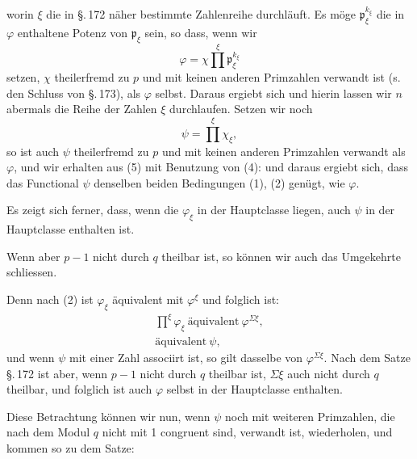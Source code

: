 worin $\xi$ die in \S.\,172 näher bestimmte Zahlenreihe durchläuft.
Es möge $\mathfrak{p}_\xi^{k_\xi}$ die in $\varphi$ enthaltene Potenz von
$\mathfrak{p}_\xi$ sein, so dass, wenn wir
\[
\varphi = \chi \prod^{\xi} \mathfrak{p}_\xi^{k_\xi}
\]
setzen, $\chi$ theilerfremd zu $p$ und mit keinen anderen Primzahlen verwandt
ist (s. den Schluss von \S.\,173), als $\varphi$ selbst. Daraus ergiebt sich
und hierin lassen wir $n$ abermals die Reihe der Zahlen $\xi$ durchlaufen.
Setzen wir noch
\[
\psi = \prod^{\xi} \chi_\xi,
\]
so ist auch $\psi$ theilerfremd zu $p$ und mit keinen anderen Primzahlen
 verwandt als $\varphi$, und wir erhalten aus (5) mit Benutzung von (4):
und daraus ergiebt sich, dass das Functional $\psi$ denselben beiden
Bedingungen (1), (2) genügt, wie $\varphi$.

Es zeigt sich ferner, dass, wenn die $\varphi_\xi$ in der Hauptclasse
liegen, auch $\psi$ in der Hauptclasse enthalten ist.

Wenn aber $p-1$ nicht durch $q$ theilbar ist, so können wir
auch das Umgekehrte schliessen.

Denn nach (2) ist $\varphi_\xi$ äquivalent mit $\varphi^\xi$ und folglich ist:
\[
\begin{gathered}
\prod^{\xi} \varphi_\xi \ \text{äquivalent}\ \varphi^{\Sigma\xi}, \\
\text{äquivalent}\ \psi,
\end{gathered}
\]
und wenn $\psi$ mit einer Zahl associirt ist, so gilt dasselbe
von $\varphi^{\Sigma\xi}$. Nach dem Satze \S.\,172 ist aber, wenn $p-1$ nicht
durch $q$ theilbar ist, $\Sigma \xi$ auch nicht durch $q$ theilbar, und folglich
 ist auch $\varphi$ selbst in der Hauptclasse enthalten.

Diese Betrachtung können wir nun, wenn $\psi$ noch mit
weiteren Primzahlen, die nach dem Modul $q$ nicht mit 1 congruent
 sind, verwandt ist, wiederholen, und kommen so zu dem
Satze:

